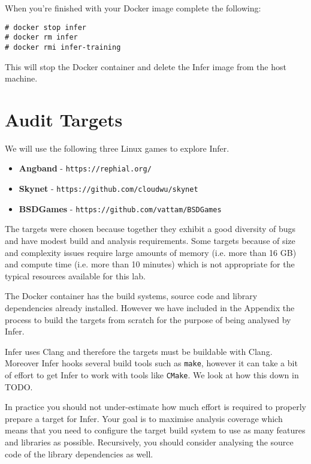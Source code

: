 When you're finished with your Docker image complete the following:

\begin{verbatim}
# docker stop infer
# docker rm infer
# docker rmi infer-training
\end{verbatim}

This will stop the Docker container and delete the Infer image from the host machine.

\section{Audit Targets}

We will use the following three Linux games to explore Infer.

\begin{itemize}
	\itemsep0em 
	\item \textbf{Angband} - \verb|https://rephial.org/|
	\item \textbf{Skynet} - \verb|https://github.com/cloudwu/skynet|
	\item \textbf{BSDGames} - \verb|https://github.com/vattam/BSDGames|
\end{itemize}

The targets were chosen because together they exhibit a good diversity of bugs
and have modest build and analysis requirements. 
Some targets because of size and complexity issues require large amounts of 
memory (i.e. more than 16 GB) and compute time (i.e. more than 10 minutes) which is not appropriate
for the typical resources available for this lab.

The Docker container has the build systems, source code and library dependencies
already installed. 
However we have included in the Appendix the process to build the targets 
from scratch for the purpose of being analysed by Infer.

Infer uses Clang and therefore the targets must be buildable with Clang.
Moreover Infer hooks several build tools such as \verb|make|, however
it can take a bit of effort to get Infer to work with tools like \verb|CMake|.
We look at how this down in TODO.

In practice you should not under-estimate how much effort is required to 
properly prepare a target for Infer. Your goal is to maximise analysis
coverage which means that you need to configure the target build system 
to use as many features and libraries as possible. 
Recursively, you should consider analysing the source code of the library dependencies
as well.

